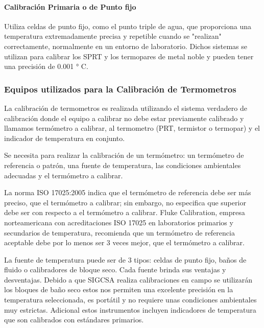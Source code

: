 		\paragraph{Calibración Primaria o de Punto fijo}
			\par 
				Utiliza celdas de punto fijo, como el punto triple de agua, que proporciona una temperatura extremadamente precisa y repetible cuando se "realizan" correctamente, normalmente en un entorno de laboratorio. Dichos sistemas se utilizan para calibrar los SPRT y los termopares de metal noble y pueden tener una precisión de 0.001 ° C.
				
	\subsubsection{Equipos utilizados para la Calibración de Termometros}
		\par 
			La calibración de termometros es realizada utilizando el sistema verdadero de calibración donde el equipo a calibrar no debe estar previamente calibrado y llamamos termómetro a calibrar, al termometro (PRT, termistor o termopar) y el indicador de temperatura en conjunto.
			
		\par \noindent
			Se necesita para realizar la calibración de un termómetro: un termómetro de referencia o patrón, una fuente de temperatura, las condiciones ambientales adecuadas y el termómetro a calibrar.
			
		\par \noindent
			La norma ISO 17025:2005 indica que el termómetro de referencia debe ser más preciso, que el termómetro a calibrar; sin embargo, no especifica que superior debe ser con respecto a el termómetro a calibrar. Fluke Calibration, empresa norteamericana con acreditaciones ISO 17025 en laboratorios primarios y secundarios de temperatura, recomienda que un termómetro de referencia aceptable debe por lo menos ser 3 veces mejor, que el termómetro a calibrar.
			
\clearpage
\thispagestyle{plain}

		\par \noindent
			La fuente de temperatura puede ser de 3 tipos: celdas de punto fijo, baños de fluido o calibradores de bloque seco.
			Cada fuente brinda sus ventajas y desventajas. Debido a que SIGCSA realiza calibraciones en campo se utilizarán los bloques de baño seco estos nos permiten una excelente precisión en la temperatura seleccionada, es portátil y no requiere unas condiciones ambientales muy estrictas.
			Adicional estos instrumentos incluyen indicadores de temperatura que son calibrados con estándares primarios.
			
